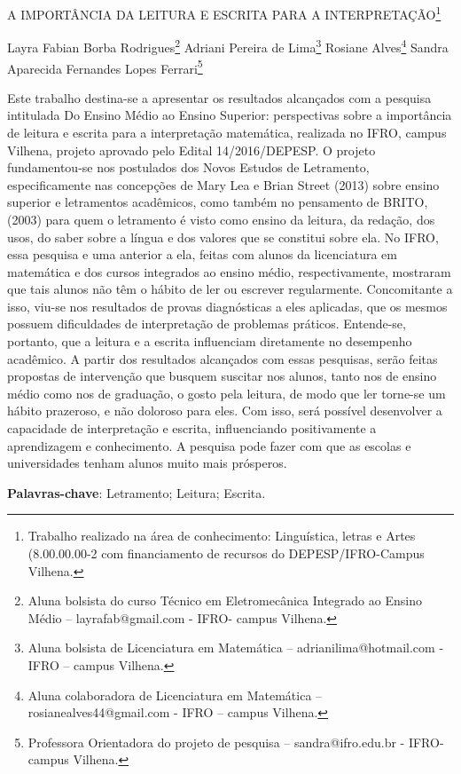 \documentclass[article,12pt,onesidea,4paper,english,brazil]{abntex2}
\begin{document}
	
	
	\frenchspacing 
	
	\begin{center}
		\LARGE A IMPORTÂNCIA DA LEITURA E ESCRITA PARA A INTERPRETAÇÃO\footnote{Trabalho realizado na área de conhecimento: Linguística, letras e Artes (8.00.00.00-2 com
			financiamento de recursos do DEPESP/IFRO-Campus Vilhena.}
		
		\normalsize
		Layra Fabian Borba Rodrigues\footnote{Aluna bolsista do curso Técnico em Eletromecânica Integrado ao Ensino Médio –
			layrafab@gmail.com - IFRO- campus Vilhena.} 
		Adriani Pereira de Lima\footnote{Aluna bolsista de Licenciatura em Matemática – adrianilima@hotmail.com - IFRO – campus Vilhena.} 
		Rosiane Alves\footnote{Aluna colaboradora de Licenciatura em Matemática – rosianealves44@gmail.com - IFRO – campus
			Vilhena.} 
		Sandra Aparecida Fernandes Lopes Ferrari\footnote{Professora Orientadora do projeto de pesquisa – sandra@ifro.edu.br - IFRO- campus Vilhena.} 
	\end{center}
	
	\noindent Este trabalho destina-se a apresentar os resultados alcançados com a pesquisa
	intitulada Do Ensino Médio ao Ensino Superior: perspectivas sobre a importância de
	leitura e escrita para a interpretação matemática, realizada no IFRO, campus
	Vilhena, projeto aprovado pelo Edital 14/2016/DEPESP. O projeto fundamentou-se
	nos postulados dos Novos Estudos de Letramento, especificamente nas concepções
	de Mary Lea e Brian Street (2013) sobre ensino superior e letramentos acadêmicos,
	como também no pensamento de BRITO, (2003) para quem o letramento é visto
	como ensino da leitura, da redação, dos usos, do saber sobre a língua e dos valores
	que se constitui sobre ela. No IFRO, essa pesquisa e uma anterior a ela, feitas com
	alunos da licenciatura em matemática e dos cursos integrados ao ensino médio,
	respectivamente, mostraram que tais alunos não têm o hábito de ler ou escrever
	regularmente. Concomitante a isso, viu-se nos resultados de provas diagnósticas a
	eles aplicadas, que os mesmos possuem dificuldades de interpretação de problemas
	práticos. Entende-se, portanto, que a leitura e a escrita influenciam diretamente no
	desempenho acadêmico. A partir dos resultados alcançados com essas pesquisas,
	serão feitas propostas de intervenção que busquem suscitar nos alunos, tanto nos
	de ensino médio como nos de graduação, o gosto pela leitura, de modo que ler
	torne-se um hábito prazeroso, e não doloroso para eles. Com isso, será possível
	desenvolver a capacidade de interpretação e escrita, influenciando positivamente a
	aprendizagem e conhecimento. A pesquisa pode fazer com que as escolas e
	universidades tenham alunos muito mais prósperos.
	
	\vspace{\onelineskip}
	
	\noindent
	\textbf{Palavras-chave}: Letramento; Leitura; Escrita.
	
\end{document}
